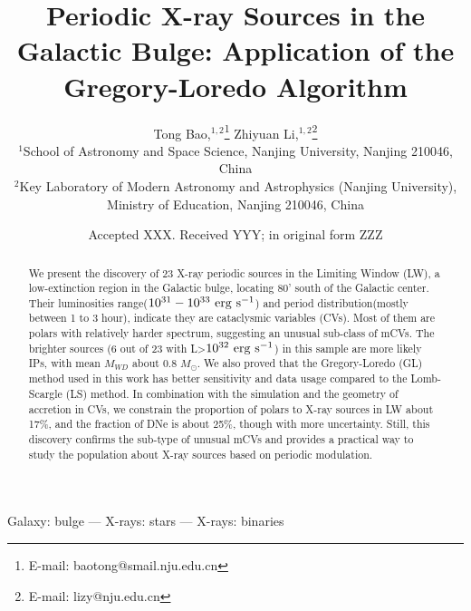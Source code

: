\documentclass[fleqn,usenatbib]{mnras}
\title[Periodic X-ray Sources in the Galactic Bulge]{Periodic X-ray Sources in the Galactic Bulge: Application of the Gregory-Loredo Algorithm}
\author[Bao \& Li]{
Tong Bao,$^{1,2}$\thanks{E-mail: baotong@smail.nju.edu.cn}
Zhiyuan Li,$^{1,2}$\thanks{E-mail: lizy@nju.edu.cn}
\\
$^{1}$School of Astronomy and Space Science, Nanjing University, Nanjing 210046, China\\
$^{2}$Key Laboratory of Modern Astronomy and Astrophysics (Nanjing University), Ministry of Education, Nanjing 210046, China
}
\date{Accepted XXX. Received YYY; in original form ZZZ}
\begin{document}
\maketitle
\begin{abstract}
We present the discovery of 23 X-ray periodic sources in the Limiting Window (LW), a low-extinction region in the Galactic bulge, locating 80' south of the Galactic center. Their luminosities range(${\rm 10^{31}-10^{33} ~erg ~ s^{-1}}$) and period distribution(mostly between 1 to 3 hour), indicate they are cataclysmic variables (CVs). Most of them are polars with relatively harder spectrum, suggesting an unusual sub-class of mCVs.
The brighter sources (6 out of 23 with L>$\rm 10^{32} ~erg~s^{-1}$) in this sample are more likely IPs, with mean $M_{WD}$ about 0.8 $M_\odot$.
We also proved that the Gregory-Loredo (GL) method used in this work has better sensitivity and data usage compared to the Lomb-Scargle (LS) method. In combination with the simulation and the geometry of accretion in CVs, we constrain the proportion of polars to X-ray sources in LW about 17\%, and the fraction of DNe is about 25\%, though with more uncertainty. Still, this discovery confirms the sub-type of unusual mCVs and provides a practical way to study the population about X-ray sources based on periodic modulation.
\end{abstract}

\begin{keywords}
Galaxy: bulge --- X-rays: stars --- X-rays: binaries
\end{keywords}
\end{document}
